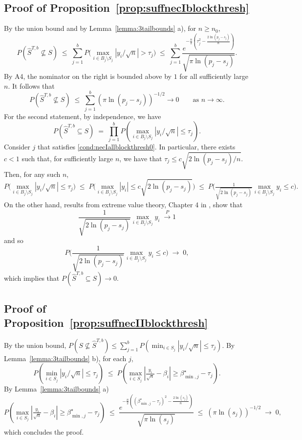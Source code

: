 \documentclass[aos]{imsart}
\theoremstyle{plain}
\begin{document}
\subsection{Proof of Proposition~\ref{prop:suffnecIblockthresh}} By the union bound and by Lemma~\ref{lemma:3tailbounds} a), for $n\geq n_0$, \begin{equation*}
P\left(\hat{S}^{T,b} \not\subseteq S\right)\;\leq\; \sum_{j=1}^b P\Big(\max_{i\in B_j\setminus S_j}|y_i/\sqrt{n}|>\tau_{j}\Big)\;\leq\;\sum_{j=1}^b\frac{e^{-\tfrac{n}{2}\left(\tau_j^2-\tfrac{2\ln(p_j-s_j)}{n}\right)}}{\sqrt{\pi\ln(p_j-s_j)}} 	.
 \end{equation*}
 By A4, the nominator on the right is bounded above by $1$ for all sufficiently large $n$. It follows that 
	$$P\left(\hat{S}^{T,b} \not\subseteq S\right) \;\leq\; \sum_{j=1}^b (\pi\ln (p_j-s_j))^{-1/2} \to 0\qquad \mbox{as } n\to \infty.$$
For the second statement, by independence, we have 
$$P(\hat{S}^{T,b} \subseteq S)\;=\;\prod_{j=1}^b P(\max_{i \in B_j\setminus S_j}|y_i/\sqrt{n}| \leq \tau_j).$$ 
Consider $j$ that satisfies \eqref{cond:necIallblockthresh0}. In particular, there exists $c<1$ such that, for sufficiently large $n$, we have that $\tau_j\leq c\sqrt{2\ln(p_j-s_j)/n}$. Then, for any such $n$,
$$
P\Big(\max_{i \in B_j\setminus S_j}|y_i/\sqrt{n}| \leq \tau_j\Big)\;\leq\; P\Big(\max_{i \in B_j\setminus S_j}|y_i| \leq c \sqrt{2\ln(p_j-s_j)}\Big)\;\leq\;P\Big(\tfrac{1}{\sqrt{2\ln(p_j-s_j)}}\max_{i \in B_j\setminus S_j}y_i \leq c \Big).
$$
On the other hand, results from extreme value theory, Chapter 4 in \cite{galambos}, show that 
 $$\frac{1}{\sqrt{2 \ln(p_j-s_j)}}\max_{i\in B_j\setminus S_j}y_i \;\overset{P}{\longrightarrow} 1$$
 and so 
 $$
 P\Big(\frac{1}{\sqrt{2\ln(p_j-s_j)}}\max_{i \in B_j\setminus S_j}y_i \leq c \Big)\;\to\;0,
 $$ 
 which implies that $P(\hat{S}^{T,b} \subseteq S)\to 0$. 

\subsection{Proof of Proposition~\ref{prop:suffnecIIblockthresh}}
	 By the union bound, 
	$P\left(S \not\subseteq \hat{S}^{T,b}\right)\leq \sum_{j=1}^b  P\left(\min_{i\in S_j}|y_i/\sqrt{n}|\leq\tau_j\right)$. 
	By Lemma~\ref{lemma:3tailbounds} b), for each $j$,	
	$$P\left(\min_{i\in S_j}|y_i/\sqrt{n}|\leq\tau_j\right)\;\leq\; P\left(\max_{i\in S_j}|\tfrac{y_i}{\sqrt{n}}-\beta_i| \geq\beta_{\min,j}^{\star}-\tau_j \right).$$ By Lemma~\ref{lemma:3tailbounds} a)  
	\begin{equation}\label{eq:rate2}
P\left(\max_{i\in S_j}|\tfrac{y_i}{\sqrt{n}}-\beta_i| \geq\beta_{\min,j}^{\star}-\tau_j \right) \;\leq\;\frac{e^{-\tfrac{n}{2}\left((\beta^\star_{\min,j}-\tau_j)^2-\tfrac{2\ln(s_j)}{n}\right)}}{\sqrt{\pi\ln(s_j)}}\;\leq\; (\pi\ln (s_j))^{-1/2}\;\to\;0,		
	\end{equation}
	which concludes the proof. 
\end{document}
